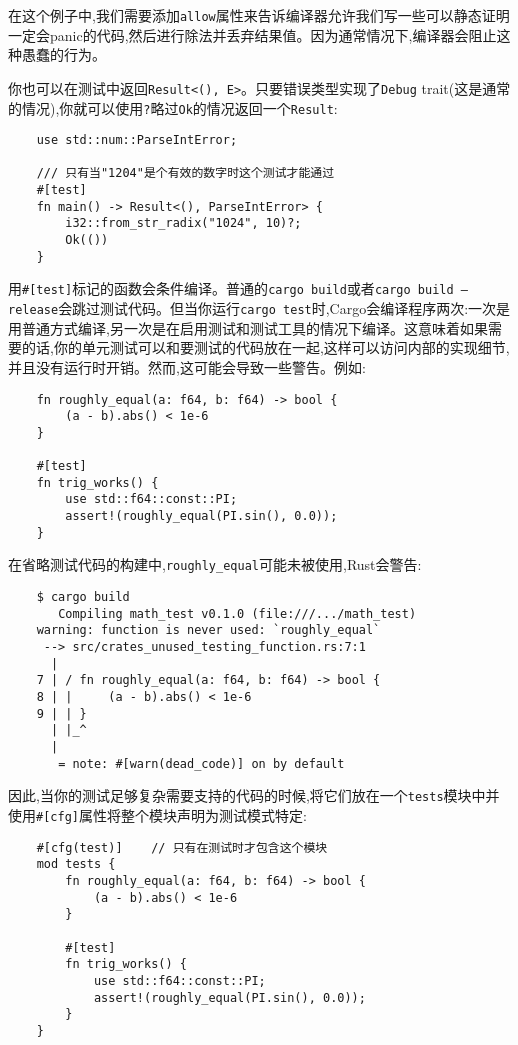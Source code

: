 在这个例子中,我们需要添加\texttt{allow}属性来告诉编译器允许我们写一些可以静态证明一定会panic的代码,然后进行除法并丢弃结果值。因为通常情况下,编译器会阻止这种愚蠢的行为。

你也可以在测试中返回\texttt{Result<(), E>}。只要错误类型实现了\texttt{Debug} trait(这是通常的情况),你就可以使用\texttt{?}略过\texttt{Ok}的情况返回一个\texttt{Result}:
\begin{verbatim}
    use std::num::ParseIntError;

    /// 只有当"1204"是个有效的数字时这个测试才能通过
    #[test]
    fn main() -> Result<(), ParseIntError> {
        i32::from_str_radix("1024", 10)?;
        Ok(())
    }
\end{verbatim}

用\texttt{\#[test]}标记的函数会条件编译。普通的\texttt{cargo build}或者\texttt{cargo build --release}会跳过测试代码。但当你运行\texttt{cargo test}时,Cargo会编译程序两次:一次是用普通方式编译,另一次是在启用测试和测试工具的情况下编译。这意味着如果需要的话,你的单元测试可以和要测试的代码放在一起,这样可以访问内部的实现细节,并且没有运行时开销。然而,这可能会导致一些警告。例如:
\begin{verbatim}
    fn roughly_equal(a: f64, b: f64) -> bool {
        (a - b).abs() < 1e-6
    }

    #[test]
    fn trig_works() {
        use std::f64::const::PI;
        assert!(roughly_equal(PI.sin(), 0.0));
    }
\end{verbatim}

在省略测试代码的构建中,\texttt{roughly\_equal}可能未被使用,Rust会警告:
\begin{verbatim}
    $ cargo build
       Compiling math_test v0.1.0 (file:///.../math_test)
    warning: function is never used: `roughly_equal`
     --> src/crates_unused_testing_function.rs:7:1
      |
    7 | / fn roughly_equal(a: f64, b: f64) -> bool {
    8 | |     (a - b).abs() < 1e-6    
    9 | | }
      | |_^
      |
       = note: #[warn(dead_code)] on by default
\end{verbatim}

因此,当你的测试足够复杂需要支持的代码的时候,将它们放在一个\texttt{tests}模块中并使用\texttt{\#[cfg]}属性将整个模块声明为测试模式特定:
\begin{verbatim}
    #[cfg(test)]    // 只有在测试时才包含这个模块
    mod tests {
        fn roughly_equal(a: f64, b: f64) -> bool {
            (a - b).abs() < 1e-6
        }

        #[test]
        fn trig_works() {
            use std::f64::const::PI;
            assert!(roughly_equal(PI.sin(), 0.0));
        }
    }
\end{verbatim}

